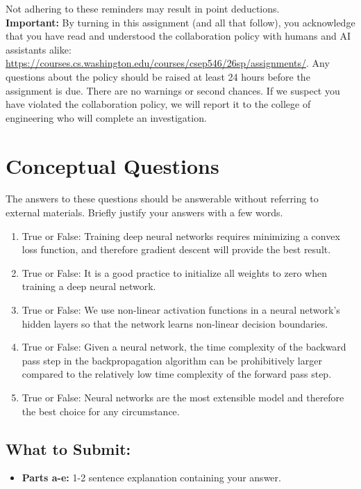 \documentclass{article}
\begin{document}
Not adhering to these reminders may result in point deductions. \\

\textbf{Important:} By turning in this assignment (and all that follow), you acknowledge that you have read and understood the collaboration policy with humans and AI assistants alike: \url{https://courses.cs.washington.edu/courses/csep546/26sp/assignments/}. Any questions about the policy should be raised at least 24 hours before the assignment is due. There are no warnings or second chances. If we suspect you have violated the collaboration policy, we will report it to the college of engineering who will complete an investigation.

\clearpage{}

\section*{Conceptual Questions}
\begin{aprob}
    The answers to these questions should be answerable without referring to external materials. Briefly justify your answers with a few words.
    \begin{enumerate}
        \item {} True or False: Training deep neural networks requires minimizing a convex loss function, and therefore gradient descent will provide the best result.
        \item {} True or False: It is a good practice to initialize all weights to zero when training a deep neural network.
        \item {} True or False: We use non-linear activation functions in a neural network's hidden layers so that the network learns non-linear decision boundaries.
        \item {} True or False: Given a neural network, the time complexity of the backward pass step in the backpropagation algorithm can be prohibitively larger compared to the relatively low time complexity of the forward pass step.
        \item {} True or False: Neural networks are the most extensible model and therefore the best choice for any circumstance.
    \end{enumerate}
    \subsection*{What to Submit:}
    \begin{itemize}
        \item \textbf{Parts a-e:} 1-2 sentence explanation containing your answer.
    \end{itemize}
\end{aprob}
\end{document}
